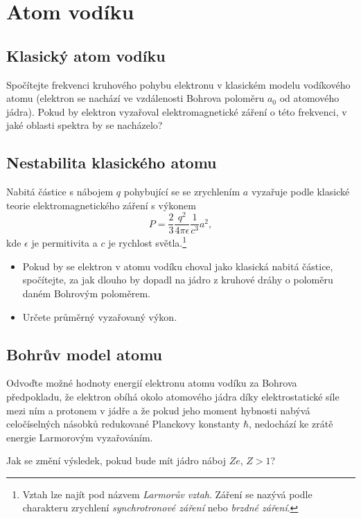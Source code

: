\section{Atom vodíku}
\subsection{Klasický atom vodíku}
    Spočítejte frekvenci kruhového pohybu elektronu v klasickém modelu vodíkového atomu (elektron se nachází ve vzdálenosti Bohrova poloměru $a_{0}$ od atomového jádra).
    Pokud by elektron vyzařoval elektromagnetické záření o této frekvenci, v jaké oblasti spektra by se nacházelo?

\subsection{Nestabilita klasického atomu}
    Nabitá částice s nábojem $q$ pohybující se se zrychlením $a$ vyzařuje podle klasické teorie elektromagnetického záření s výkonem
    \begin{equation}
        P=\frac{2}{3}\frac{q^2}{4\pi\epsilon}\frac{1}{c^3}a^{2},
    \end{equation}
    kde $\epsilon$ je permitivita a $c$ je rychlost světla.\footnote{Vztah lze najít pod názvem \emph{Larmorův vztah}. Záření se nazývá podle charakteru zrychlení \emph{synchrotronové záření} nebo \emph{brzdné záření}.}

    \begin{itemize}
        \item
            Pokud by se elektron v atomu vodíku choval jako klasická nabitá částice, spočítejte, za jak dlouho by dopadl na jádro z kruhové dráhy o poloměru daném Bohrovým poloměrem.
        \item
            Určete průměrný vyzařovaný výkon.
    \end{itemize}

\subsection{Bohrův model atomu}
    Odvoďte možné hodnoty energií elektronu atomu vodíku za Bohrova předpokladu, že elektron obíhá okolo atomového jádra díky elektrostatické síle mezi ním a protonem v jádře a že pokud jeho moment hybnosti nabývá celočíselných násobků redukované Planckovy konstanty $\hbar$, nedochází ke zrátě energie Larmorovým vyzařováním.

    Jak se změní výsledek, pokud bude mít jádro náboj $Ze$, $Z>1$?

